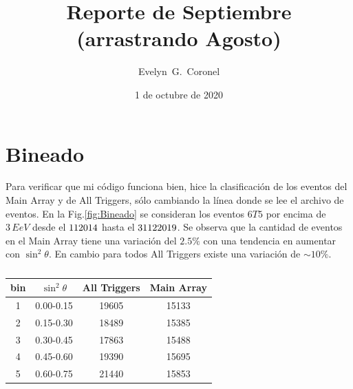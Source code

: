 
\usepackage{physics}


\title{Reporte de Septiembre (arrastrando Agosto)}
\author{Evelyn~G.~Coronel}


\date[]{\lowercase{1 de octubre de 2020}} %


\maketitle

\section*{Bineado}

Para verificar que mi código funciona bien, hice la clasificación de los eventos del Main Array y de All Triggers, sólo cambiando la línea donde se lee el archivo de eventos.  En la Fig.\ref{fig:Bineado} se consideran los eventos $6T5$ por encima de $3\,EeV$ desde el $1\/1\/2014$  hasta el $31\/12\/2019$. Se observa que la cantidad de eventos en el Main Array tiene una variación del $2.5\%$ con una tendencia en aumentar con $\sin^2 \theta$. En cambio para todos All Triggers existe una variación de  $\sim 10 \%$.

\begin{table}[H]
    \begin{small}
        \begin{center}
            \begin{tabular}[c]{c|c|c|c}
                bin & $\sin^2\theta$ & All Triggers & Main Array \\
                \hline
                1& 0.00-0.15 & 19605 & 15133\\
                2& 0.15-0.30 & 18489 & 15385\\
                3& 0.30-0.45 & 17863 & 15488\\
                4& 0.45-0.60 & 19390 & 15695\\
                5& 0.60-0.75 & 21440 & 15853\\
            \end{tabular}            \caption{}
        \label{tab:}
    \end{center}
    \end{small}
\end{table}


